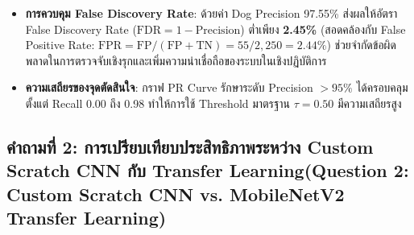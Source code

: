 \documentclass[12pt,a4paper]{article}
\begin{document}
\begin{ansbox}[fontupper=\small, left=6pt, right=6pt, top=2pt, bottom=2pt]
\begin{enumerate}[leftmargin=13pt, itemsep=1pt, topsep=0.5pt, parsep=0pt]
\begin{itemize}[leftmargin=9pt, itemsep=0.5pt, topsep=0.5pt, parsep=0pt]
        \item \textbf{การควบคุม False Discovery Rate}: ด้วยค่า Dog Precision 97.55\% ส่งผลให้อัตรา False Discovery Rate ($\text{FDR} = 1 - \text{Precision}$) ต่ำเพียง \textbf{2.45\%} (สอดคล้องกับ False Positive Rate: $\text{FPR} = \text{FP}/(\text{FP}+\text{TN}) = 55/2,250 = 2.44\%$) ช่วยจำกัดข้อผิดพลาดในการตรวจจับเชิงรุกและเพิ่มความน่าเชื่อถือของระบบในเชิงปฏิบัติการ
        \item \textbf{ความเสถียรของจุดตัดสินใจ}: กราฟ PR Curve รักษาระดับ Precision $> 95\%$ ได้ครอบคลุมตั้งแต่ Recall 0.00 ถึง 0.98 ทำให้การใช้ Threshold มาตรฐาน $\tau = 0.50$ มีความเสถียรสูง
    \end{itemize}
\end{enumerate}
\end{ansbox}

\clearpage
\subsection*{คำถามที่ 2: การเปรียบเทียบประสิทธิภาพระหว่าง Custom Scratch CNN กับ Transfer Learning\newline \normalsize(Question 2: Custom Scratch CNN vs. MobileNetV2 Transfer Learning)}
\end{document}
